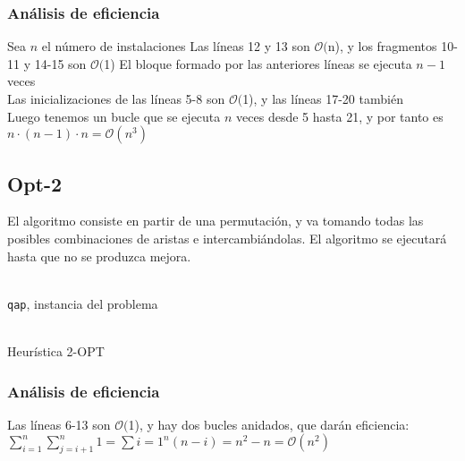 \documentclass[a4paper, 11pt]{article} %
\newcommand{\ef}[1]{$\mathcal{O}#1$}
\begin{document}
\subsubsection{Análisis de eficiencia}
Sea $n$ el número de instalaciones
Las líneas 12 y 13 son \ef(n), y los fragmentos 10-11 y 14-15 son \ef(1)
El bloque formado por las anteriores líneas se ejecuta $n-1$ veces\\

Las inicializaciones de las líneas 5-8 son \ef(1), y las líneas 17-20 también\\

Luego tenemos un bucle que se ejecuta $n$ veces desde 5 hasta 21, y por tanto
es $n\cdot(n-1)\cdot n = \mathcal{O}(n^3)$

\subsection{Opt-2}
El algoritmo consiste en partir de una permutación, y va tomando todas las posibles
combinaciones de aristas e intercambiándolas. El algoritmo se ejecutará
hasta que no se produzca mejora.
\begin{algorithm}[H]
	\begin{algorithmic}[1]
		\REQUIRE \ \\
        	\texttt{qap}, instancia del problema \\\
	      \STATE{\texttt{old\_cost=qap.cost}}
	      \ELSE
	      \ENDIF  
	  \ENDFOR
	\ENDFOR
	\ENDWHILE
	\end{algorithmic}
    \caption{Heurística 2-OPT}
    \label{opt2}
\end{algorithm}  

\subsubsection{Análisis de eficiencia}
Las líneas 6-13 son \ef(1), y hay dos bucles anidados, que darán eficiencia:
$\sum_{i=1}^{n} \sum_{j=i+1}^{n} 1 = \sum{i=1}^{n} (n-i)= n^2-n=\mathcal{O}(n^2)$
\end{document}
